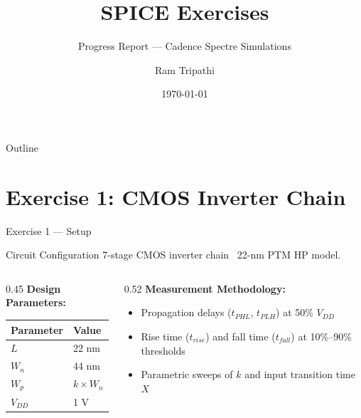 \documentclass[aspectratio=169, 11pt]{beamer}
\title{SPICE Exercises}
\subtitle{Progress Report — Cadence Spectre Simulations}
\author{Ram Tripathi}
\date{\today}
\begin{document}
{
\begin{frame}
    \titlepage
\end{frame}
}

\begin{frame}{Outline}
    \tableofcontents
\end{frame}

\section{Exercise 1: CMOS Inverter Chain}

\begin{frame}{Exercise 1 — Setup}
    \begin{block}{Circuit Configuration}
        7-stage CMOS inverter chain \textemdash\ 22-nm PTM HP model.
    \end{block}
    \vspace{0.4em}
    \begin{columns}[T]
        \begin{column}{0.45\textwidth}
            \textbf{Design Parameters:}
            \begin{table}
                \centering
                \begin{tabular}{@{}ll@{}}
                    \toprule
                    Parameter & Value \\
                    \midrule
                    $L$ & 22 nm \\
                    $W_n$ & 44 nm \\
                    $W_p$ & $k \times W_n$ \\
                    $V_{DD}$ & 1 V \\
                    \bottomrule
                \end{tabular}
            \end{table}
        \end{column}
        \begin{column}{0.52\textwidth}
            \textbf{Measurement Methodology:}
            \begin{itemize}
                \item Propagation delays ($t_{PHL}$, $t_{PLH}$) at 50\% $V_{DD}$
                \item Rise time ($t_{rise}$) and fall time ($t_{fall}$) at 10\%--90\% thresholds
                \item Parametric sweeps of $k$ and input transition time $X$
            \end{itemize}
        \end{column}
    \end{columns}
\end{frame}
\end{document}
